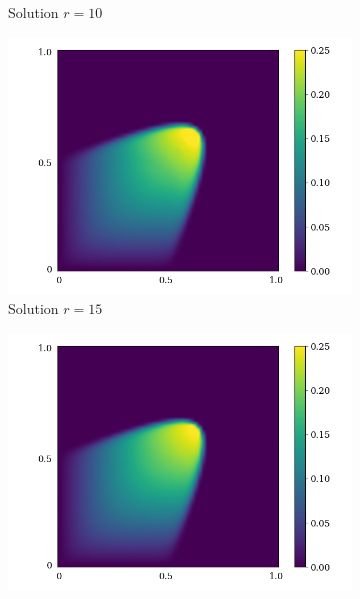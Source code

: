\begin{figure}[ht!]
\begin{center}
\begin{subfigure}[b]{0.20\textwidth}
\begin{center}
            \end{center}
             \caption{Solution $r = 10$}
         \end{subfigure}
    \begin{subfigure}[b]{0.20\textwidth}
            \begin{center}
                \includegraphics[trim = {0, 0, 3cm, 0}, clip, width=\textwidth]{Pictures/X-rom-LE-CNNAE-15.png}
            \end{center}
             \caption{Solution $r = 15$}
         \end{subfigure}
    \begin{subfigure}[b]{0.20\textwidth}
            \begin{center}
                \includegraphics[trim = {0, 0, 3cm, 0}, clip, width=\textwidth]{Pictures/X-rom-LE-CNNAE-20.png}

\end{center}
\end{subfigure}
\end{center}
\end{figure}
